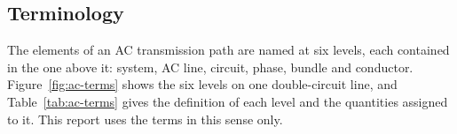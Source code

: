 \subsection{Terminology}
\label{sec:ac-terms}

The elements of an AC transmission path are named at six levels, each
contained in the one above it: system, AC line, circuit, phase, bundle and
conductor. Figure~\ref{fig:ac-terms} shows the six levels on one
double-circuit line, and Table~\ref{tab:ac-terms} gives the definition of
each level and the quantities assigned to it. This report uses the terms in
this sense only.


